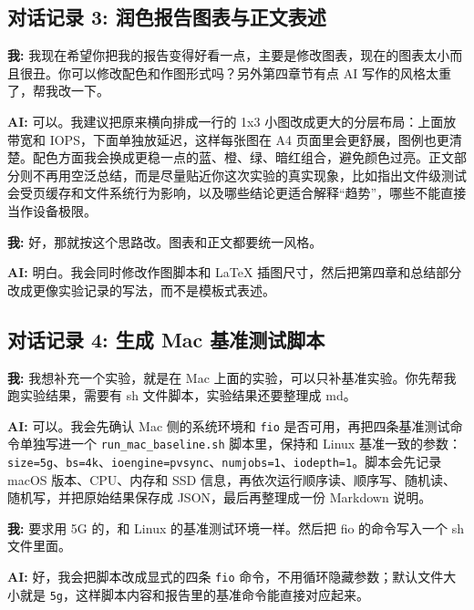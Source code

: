 \documentclass[a4paper]{article}
\begin{document}
\subsection{对话记录 3: 润色报告图表与正文表述}

\begin{tcolorbox}[colframe=blue!30!white, colback=blue!5!white, coltitle=black, title=对话内容]
\textbf{我:} 我现在希望你把我的报告变得好看一点，主要是修改图表，现在的图表太小而且很丑。你可以修改配色和作图形式吗？另外第四章节有点 AI 写作的风格太重了，帮我改一下。

\textbf{AI:} 可以。我建议把原来横向排成一行的 1x3 小图改成更大的分层布局：上面放带宽和 IOPS，下面单独放延迟，这样每张图在 A4 页面里会更舒展，图例也更清楚。配色方面我会换成更稳一点的蓝、橙、绿、暗红组合，避免颜色过亮。正文部分则不再用空泛总结，而是尽量贴近你这次实验的真实现象，比如指出文件级测试会受页缓存和文件系统行为影响，以及哪些结论更适合解释“趋势”，哪些不能直接当作设备极限。

\textbf{我:} 好，那就按这个思路改。图表和正文都要统一风格。

\textbf{AI:} 明白。我会同时修改作图脚本和 LaTeX 插图尺寸，然后把第四章和总结部分改成更像实验记录的写法，而不是模板式表述。
\end{tcolorbox}

\subsection{对话记录 4: 生成 Mac 基准测试脚本}

\begin{tcolorbox}[colframe=blue!30!white, colback=blue!5!white, coltitle=black, title=对话内容]
\textbf{我:} 我想补充一个实验，就是在 Mac 上面的实验，可以只补基准实验。你先帮我跑实验结果，需要有 sh 文件脚本，实验结果还要整理成 md。

\textbf{AI:} 可以。我会先确认 Mac 侧的系统环境和 \texttt{fio} 是否可用，再把四条基准测试命令单独写进一个 \texttt{run\_mac\_baseline.sh} 脚本里，保持和 Linux 基准一致的参数：\texttt{size=5g}、\texttt{bs=4k}、\texttt{ioengine=pvsync}、\texttt{numjobs=1}、\texttt{iodepth=1}。脚本会先记录 macOS 版本、CPU、内存和 SSD 信息，再依次运行顺序读、顺序写、随机读、随机写，并把原始结果保存成 JSON，最后再整理成一份 Markdown 说明。

\textbf{我:} 要求用 5G 的，和 Linux 的基准测试环境一样。然后把 fio 的命令写入一个 sh 文件里面。

\textbf{AI:} 好，我会把脚本改成显式的四条 \texttt{fio} 命令，不用循环隐藏参数；默认文件大小就是 \texttt{5g}，这样脚本内容和报告里的基准命令能直接对应起来。
\end{tcolorbox}
\end{document}
